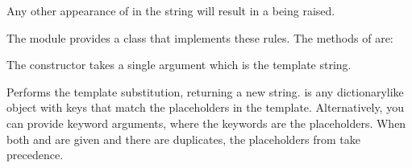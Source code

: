 \documentclass[letterpaper,10pt,english]{sphinxmanual}
\begin{document}
Any other appearance of \sphinxcode{\sphinxupquote{\$}} in the string will result in a 
being raised.

The {\hyperref[\detokenize{string:module-string}]{}} module provides a {\hyperref[\detokenize{string:string.Template}]{}} class that implements
these rules.  The methods of {\hyperref[\detokenize{string:string.Template}]{}} are:

\begin{fulllineitems}
\label{\detokenize{string:string.Template}}
The constructor takes a single argument which is the template string.

\begin{fulllineitems}
\label{\detokenize{string:string.Template.substitute}}
Performs the template substitution, returning a new string.   is
any dictionary\sphinxhyphen{}like object with keys that match the placeholders in the
template.  Alternatively, you can provide keyword arguments, where the
keywords are the placeholders.  When both  and  are given
and there are duplicates, the placeholders from  take precedence.

\end{fulllineitems}



\end{fulllineitems}
\end{document}
